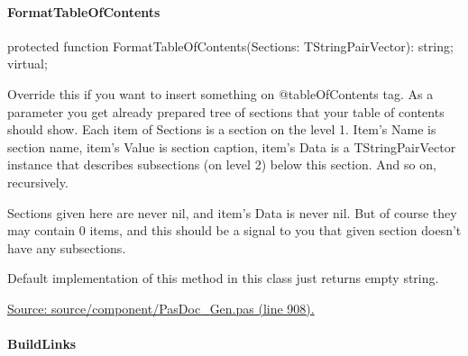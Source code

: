 \documentclass{report}
\newif\ifpdf
\begin{document}
\paragraph*{FormatTableOfContents}\hspace*{\fill}

\label{PasDoc_Gen.TDocGenerator-FormatTableOfContents}
\begin{list}{}{
\setlength{\itemindent}{0cm}
\setlength{\listparindent}{0cm}
\setlength{\leftmargin}{\evensidemargin}
\addtolength{\leftmargin}{\tmplength}
\settowidth{\labelsep}{X}
\addtolength{\leftmargin}{\labelsep}
\setlength{\labelwidth}{\tmplength}
}
\item[\textbf{Declaration}\hfill]
\ifpdf
\begin{flushleft}
\fi
\begin{ttfamily}
protected function FormatTableOfContents(Sections: TStringPairVector): string; virtual;\end{ttfamily}

\ifpdf
\end{flushleft}
\fi

\par
\item[\textbf{Description}]
Override this if you want to insert something on @tableOfContents tag. As a parameter you get already prepared tree of sections that your table of contents should show. Each item of Sections is a section on the level 1. Item's Name is section name, item's Value is section caption, item's Data is a TStringPairVector instance that describes subsections (on level 2) below this section. And so on, recursively.

Sections given here are never nil, and item's Data is never nil. But of course they may contain 0 items, and this should be a signal to you that given section doesn't have any subsections.

Default implementation of this method in this class just returns empty string.\par
\href{https://github.com/pasdoc/pasdoc/blob/master/source/component/PasDoc_Gen.pas#L908}{Source: source/component/PasDoc{\_}Gen.pas (line 908).}

\end{list}
\paragraph*{BuildLinks}\hspace*{\fill}
\end{document}
